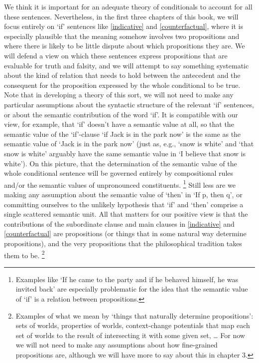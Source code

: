 \documentclass[If.tex]{subfiles}
\begin{document}
We think it is important for an adequate theory of conditionals to account for all these sentences. Nevertheless, in the first three chapters of this book, we will focus entirely on `if' sentences like \ref{indicative} and \ref{counterfactual}, where it is especially plausible that the meaning somehow involves two propositions and where there is likely to be little dispute about which propositions they are. We will defend a view on which these sentences express propositions that are evaluable for truth and falsity, and we will attempt to say something systematic about the kind of relation that needs to hold between the antecedent and the consequent for the proposition expressed by the whole conditional to be true. Note that in developing a theory of this sort, we will not need to make any particular assumptions about the syntactic structure of the relevant `if' sentences, or about the semantic contribution of the word ‘if’. It is compatible with our view, for example, that ‘if’ doesn't have a semantic value at all, so that the semantic value of the ‘if’-clause ‘if Jack is in the park now’ is the same as the semantic value of ‘Jack is in the park now’ (just as, e.g., ‘snow is white’ and ‘that snow is white’ arguably have the same semantic value in ‘I believe that snow is white’).  On this picture, that the determination of the semantic value of the whole conditional sentence will be governed entirely by compositional rules and/or the semantic values of unpronounced constituents.%
\footnote{Examples like ‘If he came to the party and if he behaved himself, he was invited back’ are especially problematic for the idea that the semantic value of ‘if’ is a relation between propositions.}
Still less are we making any assumption about the semantic value of ‘then’ in ‘If p, then q’, or committing ourselves to the unlikely hypothesis that ‘if’ and ‘then’ comprise a single scattered semantic unit. All that matters for our positive view is that the contributions of the subordinate clause and main clauses in \ref{indicative} and \ref{counterfactual} are propositions (or things that in some natural way determine propositions), and the very propositions that the philosophical tradition takes them to be.%
\footnote{Examples of what we mean by ‘things that naturally determine propositions’: sets of worlds, properties of worlds, context-change potentials that map each set of worlds to the result of intersecting it with some given set, \ldots{} For now we will not need to make any assumptions about how fine-grained propositions are, although we will have more to say about this in chapter 3.}
\end{document}
